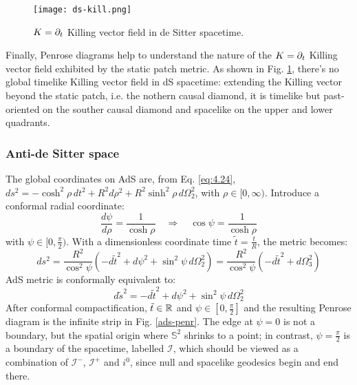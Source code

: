 \begin{figure}
  \centering
  \texttt{[image: ds-kill.png]}
  \caption{$ K = \partial_t $ Killing vector field in de Sitter spacetime.}
  \label{ds-kill}
\end{figure}

Finally, Penrose diagrams help to understand the nature of the $ K = \partial_t $ Killing vector field exhibited by the static patch metric. As shown in Fig. \ref{ds-kill}, there's no global timelike Killing vector field in dS spacetime: extending the Killing vector beyond the static patch, i.e. the nothern causal diamond, it is timelike but past-oriented on the souther causal diamond and spacelike on the upper and lower quadrants.

\subsubsection{Anti-de Sitter space}

The global coordinates on AdS are, from Eq. \ref{eq:4.24}, $ ds^2 = - \cosh^2 \rho \, dt^2 + R^2 d\rho^2 + R^2 \sinh^2 \rho \, d\Omega_2^2 $, with $ \rho \in [0,\infty) $. Introduce a conformal radial coordinate:
\begin{equation*}
  \frac{d\psi}{d\rho} = \frac{1}{\cosh \rho}
  \quad \Rightarrow \quad
  \cos \psi = \frac{1}{\cosh \rho}
\end{equation*}
with $ \psi \in [0, \frac{\pi}{2}) $. With a dimensionless coordinate time $ \tilde{t} = \frac{t}{R} $, the metric becomes:
\begin{equation*}
  ds^2 = \frac{R^2}{\cos^2 \psi} \left( -d\tilde{t}^2 + d\psi^2 + \sin^2 \psi \, d\Omega_2^2 \right) = \frac{R^2}{\cos^2 \psi} \left( -d\tilde{t}^2 + d\Omega_3^2 \right)
\end{equation*}
AdS metric is conformally equivalent to:
\begin{equation*}
  d\tilde{s}^2 = -d\tilde{t}^2 + d\psi^2 + \sin^2 \psi \, d\Omega_2^2
\end{equation*}
After conformal compactification, $ \tilde{t} \in \mathbb{R} $ and $ \psi \in \left[ 0, \frac{\pi}{2} \right] $ and the resulting Penrose diagram is the infinite strip in Fig. \ref{ads-penr}. The edge at $ \psi = 0 $ is not a boundary, but the spatial origin where $ \mathbb{S}^2 $ shrinks to a point; in contrast, $ \psi = \frac{\pi}{2} $ is a boundary of the spacetime, labelled $ \mathcal{I} $, which should be viewed as a combination of $ \mathcal{I}^- $, $ \mathcal{I}^+ $ and $ i^0 $, since null and spacelike geodesics begin and end there.

